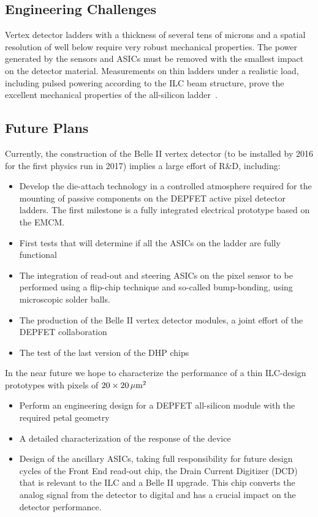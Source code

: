 \subsection{Engineering Challenges}
Vertex detector ladders with a thickness of several tens of microns and a spatial resolution of well below \unit[10]{\micron} require very robust mechanical properties. The power generated by the sensors and ASICs must be removed with the smallest impact on the detector material.
Measurements on thin ladders under a realistic load, including pulsed powering according to the ILC beam structure, prove the excellent mechanical properties of the all-silicon ladder~\cite{thermomech}.

\subsection{Future Plans}
Currently, the construction of the Belle II vertex detector (to be installed by 2016 for the first physics run in 2017) implies a large effort of R\&D, including:
\begin{itemize}
\item Develop the die-attach technology in a controlled atmosphere required for the mounting of passive components on the DEPFET active pixel detector ladders. The first milestone is a fully integrated electrical prototype based on the EMCM.
\item First tests that will determine if all the ASICs on the ladder are fully functional
\item The integration of read-out and steering ASICs on the pixel sensor to be performed using a flip-chip technique and so-called bump-bonding, using microscopic solder balls.
\item The production of the Belle II vertex detector modules, a joint effort of the DEPFET collaboration
\item The test of the last version of the DHP chips
\end{itemize}
In the near future we hope to characterize the performance of a thin ILC-design prototypes with pixels of $20 \times \unit[20]{\micron^2}$
\begin{itemize}
\item Perform an engineering design for a DEPFET all-silicon module with the required petal geometry
\item A detailed characterization of the response of the device
\item Design of the ancillary ASICs, taking full responsibility for future design cycles of the Front End read-out chip, the Drain Current Digitizer (DCD) that is relevant to the ILC and a Belle II upgrade. This chip converts the analog signal from the detector to digital and has a crucial impact on the detector performance.
\end{itemize}

